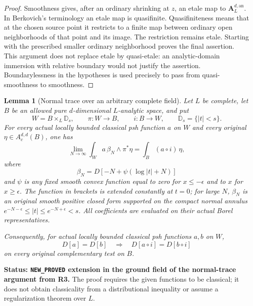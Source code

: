 \documentclass[11pt,a4paper]{article}
\numberwithin{equation}{section}
\newtheorem{lemma}[theorem]{Lemma}
\theoremstyle{definition}
\theoremstyle{remark}
\begin{document}
\begin{proof}
Smoothness gives, after an ordinary shrinking at $z$, an etale map to
$\mathbf A_L^{d,\mathrm{an}}$.  In Berkovich's terminology an etale
map is quasifinite.  Quasifiniteness means that at the chosen source
point it restricts to a finite map between ordinary open neighborhoods
of that point and its image.  The restriction remains etale.  Starting
with the prescribed smaller ordinary neighborhood proves the final
assertion.  This argument does not replace etale by quasi-etale: an
analytic-domain immersion with relative boundary would not justify the
assertion.  Boundarylessness in the hypotheses is used precisely to
pass from quasi-smoothness to smoothness.
\end{proof}

\begin{lemma}[Normal trace over an arbitrary complete field]
\label{lem:r5-arbitrary-field-normal-trace}
Let $L$ be complete, let $B$ be an allowed pure $d$-dimensional
$L$-analytic space, and put
\[
 W=B\times_L\mathbb D_s,\qquad
 \pi:W\to B,\qquad i:B\to W,
 \qquad \mathbb D_s=\{|t|<s\}.
\]
For every actual locally bounded classical psh function $a$ on $W$
and every original $\eta\in A_c^{d,d}(B)$, one has
\begin{equation}
 \lim_{N\to\infty}\int_W a\,\beta_N\wedge\pi^*\eta
       =\int_B(a\circ i)\,\eta,
 \label{eq:r5-arbitrary-field-normal-trace}
\end{equation}
where
\[
 \beta_N=D[-N+\psi(\log|t|+N)]
\]
and $\psi$ is any fixed smooth convex function equal to zero for
$x\leq-\epsilon$ and to $x$ for $x\geq\epsilon$.
The function in brackets is extended constantly at $t=0$; for large
$N$, $\beta_N$ is an original smooth positive closed form supported
on the compact normal annulus
$e^{-N-\epsilon}\leq |t|\leq e^{-N+\epsilon}<s$.
All coefficients are evaluated on their actual Borel representatives.

Consequently, for actual locally bounded classical psh functions
$a,b$ on $W$,
\[
 D[a]=D[b]\quad\Longrightarrow\quad
 D[a\circ i]=D[b\circ i]
\]
on every original complementary test on $B$.
\end{lemma}

\noindent\textbf{Status: \texttt{NEW\_PROVED} extension in the
ground field of the normal-trace argument from R3.}
The proof requires the given functions to be classical; it does not
obtain classicality from a distributional inequality or assume a
regularization theorem over $L$.
\end{document}
